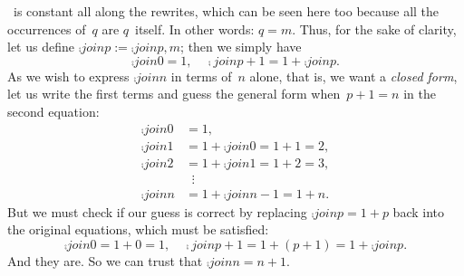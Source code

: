 ~is constant all along the rewrites, which can be seen here
too because all the occurrences of~\(q\) are \(q\)~itself. In other
words: \(q=m\). Thus, for the sake of clarity, let us define
\(\comp{join}{p} := \comp{join}{p,m}\); then we simply have
\[
\comp{join}{0}   = 1,\quad
\comp{join}{p+1} = 1 + \comp{join}{p}.
\]
As we wish to express \(\comp{join}{n}\) in terms of~\(n\) alone, that
is, we want a \emph{closed form}, let us write the first terms and
guess the general form when~\(p+1=n\) in the second equation:
\begin{align*}
\comp{join}{0} &= 1,\\
\comp{join}{1} &= 1 + \comp{join}{0} = 1 + 1 = 2,\\
\comp{join}{2} &= 1 + \comp{join}{1} = 1 + 2 = 3,\\
&\;\;\vdots\\
\comp{join}{n} &= 1 + \comp{join}{n-1} = 1 + n.
\end{align*}
But we must check if our guess is correct by replacing
\(\comp{join}{p} = 1 + p\) back into the original equations, which
must be satisfied:
\[
\comp{join}{0}   = 1 + 0 = 1,\quad
\comp{join}{p+1} = 1 + (p+1) = 1 + \comp{join}{p}.
\]
And they are. So we can trust that \(\comp{join}{n} = n + 1\).

